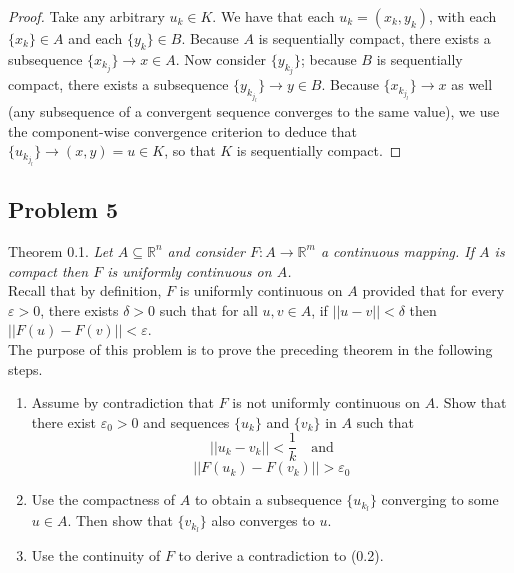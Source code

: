 \documentclass{article}
\begin{document}
\begin{proof}
Take any arbitrary ${u_k} \in K$. We have that each $u_k = (x_k, y_k)$, with each $\{x_k\} \in A$ and each $\{y_k\} \in B$. Because $A$ is sequentially compact, there exists a subsequence $\{x_{k_j}\} \to x \in A$. Now consider $\{y_{k_j}\}$; because $B$ is sequentially compact, there exists a subsequence $\{y_{k_{j_l}}\} \to y \in B$. Because $\{x_{k_{j_l}}\} \to x$ as well (any subsequence of a convergent sequence converges to the same value), we use the component-wise convergence criterion to deduce that $\{u_{k_{j_l}}\} \to (x, y) = u \in K$, so that $K$ is sequentially compact.  

\end{proof}

\subsection*{Problem 5}
Theorem 0.1. \textit{Let $A \subseteq \mathbb{R}^n$ and consider $F \colon A \to \mathbb{R}^m$ a continuous mapping. If $A$ is compact then $F$ is uniformly continuous on $A$.} \\
Recall that by definition, $F$ is uniformly continuous on $A$ provided that for every $\varepsilon > 0$, there exists $\delta > 0$ such that for all $u, v \in A$, if $||u-v|| < \delta$ then $||F(u) - F(v)|| < \varepsilon$. \\
The purpose of this problem is to prove the preceding theorem in the following steps.
\begin{enumerate}
    \item Assume by contradiction that $F$ is not uniformly continuous on $A$. Show that there exist $\varepsilon_0 > 0$ and sequences $\{u_k\}$ and $\{v_k\}$ in $A$ such that
    \[ ||u_k - v_k|| < \frac{1}{k} \quad \text{and} \]
    \[ ||F(u_k) - F(v_k)|| > \varepsilon_0\]
    \item Use the compactness of $A$ to obtain a subsequence $\{u_{k_l}\}$ converging to some $u \in A$. Then show that $\{v_{k_l}\}$ also converges to $u$.
    \item Use the continuity of $F$ to derive a contradiction to (0.2).
\end{enumerate}
\end{document}
